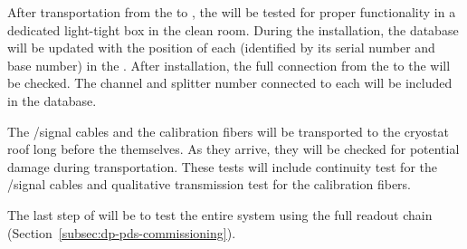 After  transportation from the  to \surf, the  will be tested for proper functionality in a dedicated light-tight box in the clean room. During the installation, the  database will be updated with the position of each  (identified by its serial number and base number) in the . After installation, the full connection from the  to the  will be checked. The  channel and splitter number connected to each  will be included in the  database.

The /signal cables and the calibration fibers will be transported to the cryostat roof long before the  themselves. As they arrive, they will be checked for potential damage during transportation. These tests will include continuity test for the /signal cables and qualitative transmission test for the calibration fibers.

The last step of  will be to test the entire system using the full readout chain (Section~\ref{subsec:dp-pds-commissioning}).
